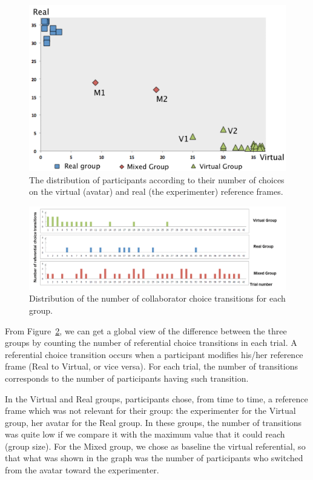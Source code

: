 \begin{figure}[tb]
  \centering
  \includegraphics[width=\textwidth]{figures/2_clustering}
  \caption{\label{fig:2_clustering}The distribution of participants according to their number of choices on the virtual (avatar) and real (the experimenter) reference frames.}
\end{figure}

\begin{figure}[tb]
  \centering
  \includegraphics[width=\textwidth]{figures/2_transition}
  \caption{\label{fig:2_transition}Distribution of the number of collaborator choice transitions for each group.}
\end{figure}

From Figure~\ref{fig:2_transition}, we can get a global view of the difference between the three groups by counting the number of referential choice transitions in each trial. A referential choice transition occurs when a participant modifies his/her reference frame (Real to Virtual, or vice versa). For each trial, the number of transitions corresponds to the number of participants having such transition.

In the Virtual and Real groups, participants chose, from time to time, a reference frame which was not relevant for their group: the experimenter for the Virtual group, her avatar for the Real group. In these groups, the number of transitions was quite low if we compare it with the maximum value that it could reach (group size). For the Mixed group, we chose as baseline the virtual referential, so that what was shown in the graph was the number of participants who switched from the avatar toward the experimenter.

